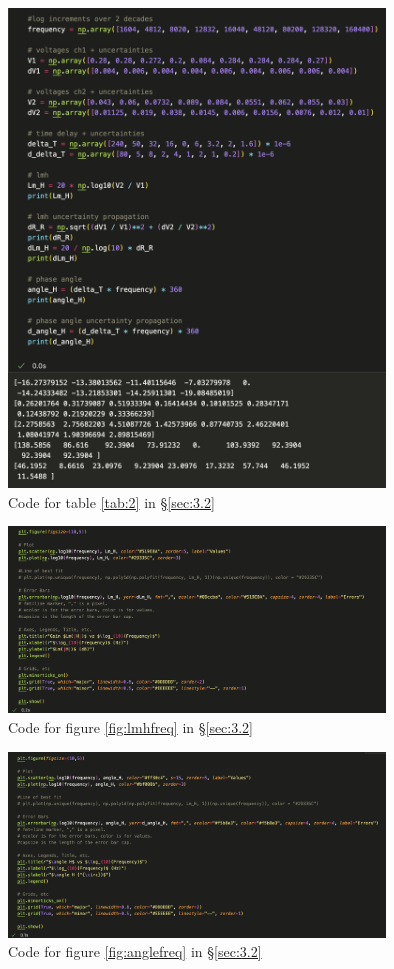 \documentclass[12pt]{article}
\begin{document}
\vspace{-1.5em}

\begin{figure}[H]
    \centering
    \includegraphics[width=10cm]{lcr code 1.png}
    \caption{\centering Code for table \ref{tab:2} in §\ref{sec:3.2}}
\end{figure}

\vspace{-1.5em}

\begin{figure}[H]
    \centering
    \includegraphics[width=10cm]{lcr code 2.png}
    \caption{\centering Code for figure \ref{fig:lmhfreq} in §\ref{sec:3.2}}
\end{figure}

\vspace{-1.5em}

\begin{figure}[H]
    \centering
    \includegraphics[width=10cm]{lcr code 3.png}
    \caption{\centering Code for figure \ref{fig:anglefreq} in §\ref{sec:3.2}}
\end{figure}
\end{document}
